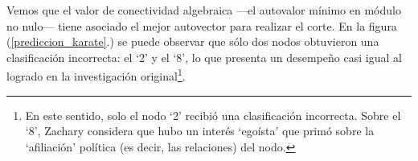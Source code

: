 
\vspace{1em}
Vemos que el valor de conectividad algebraica ---el autovalor mínimo en módulo no nulo--- tiene asociado el mejor autovector para realizar el corte. En la figura (\ref{prediccion_karate}.) se puede observar que sólo dos nodos obtuvieron una clasificación incorrecta: el `2' y el `8', lo que presenta un desempeño casi igual al logrado en la investigación original\footnote{En este sentido, solo el nodo `2' recibió una clasificación incorrecta. Sobre el `8', Zachary considera \cite{Zachary} que hubo un interés `egoísta' que primó sobre la `afiliación' política (es decir, las relaciones) del nodo.}.

